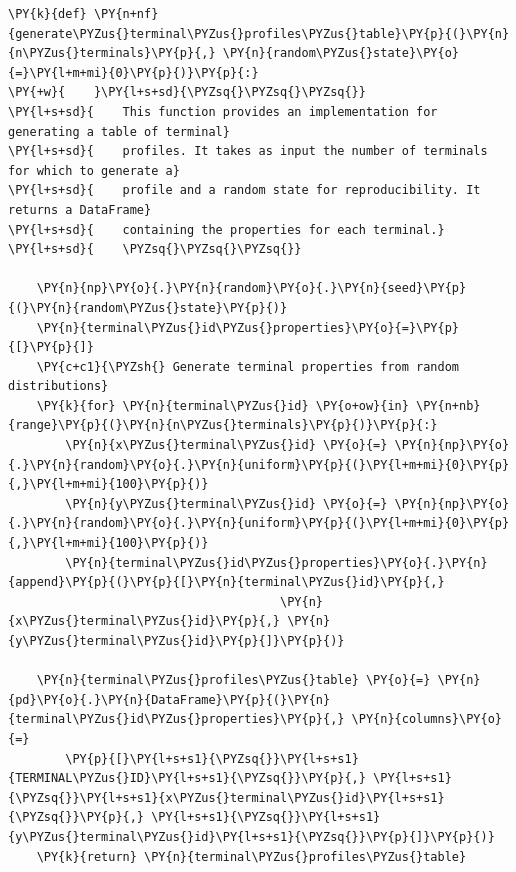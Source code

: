    \begin{tcolorbox}[breakable, size=fbox, boxrule=1pt, pad at break*=1mm,colback=cellbackground, colframe=cellborder]
\begin{Verbatim}[commandchars=\\\{\}]
\PY{k}{def} \PY{n+nf}{generate\PYZus{}terminal\PYZus{}profiles\PYZus{}table}\PY{p}{(}\PY{n}{n\PYZus{}terminals}\PY{p}{,} \PY{n}{random\PYZus{}state}\PY{o}{=}\PY{l+m+mi}{0}\PY{p}{)}\PY{p}{:}
\PY{+w}{    }\PY{l+s+sd}{\PYZsq{}\PYZsq{}\PYZsq{}}
\PY{l+s+sd}{    This function provides an implementation for generating a table of terminal}
\PY{l+s+sd}{    profiles. It takes as input the number of terminals for which to generate a}
\PY{l+s+sd}{    profile and a random state for reproducibility. It returns a DataFrame}
\PY{l+s+sd}{    containing the properties for each terminal.}
\PY{l+s+sd}{    \PYZsq{}\PYZsq{}\PYZsq{}}

    \PY{n}{np}\PY{o}{.}\PY{n}{random}\PY{o}{.}\PY{n}{seed}\PY{p}{(}\PY{n}{random\PYZus{}state}\PY{p}{)}
    \PY{n}{terminal\PYZus{}id\PYZus{}properties}\PY{o}{=}\PY{p}{[}\PY{p}{]}
    \PY{c+c1}{\PYZsh{} Generate terminal properties from random distributions}
    \PY{k}{for} \PY{n}{terminal\PYZus{}id} \PY{o+ow}{in} \PY{n+nb}{range}\PY{p}{(}\PY{n}{n\PYZus{}terminals}\PY{p}{)}\PY{p}{:}
        \PY{n}{x\PYZus{}terminal\PYZus{}id} \PY{o}{=} \PY{n}{np}\PY{o}{.}\PY{n}{random}\PY{o}{.}\PY{n}{uniform}\PY{p}{(}\PY{l+m+mi}{0}\PY{p}{,}\PY{l+m+mi}{100}\PY{p}{)}
        \PY{n}{y\PYZus{}terminal\PYZus{}id} \PY{o}{=} \PY{n}{np}\PY{o}{.}\PY{n}{random}\PY{o}{.}\PY{n}{uniform}\PY{p}{(}\PY{l+m+mi}{0}\PY{p}{,}\PY{l+m+mi}{100}\PY{p}{)}
        \PY{n}{terminal\PYZus{}id\PYZus{}properties}\PY{o}{.}\PY{n}{append}\PY{p}{(}\PY{p}{[}\PY{n}{terminal\PYZus{}id}\PY{p}{,}
                                      \PY{n}{x\PYZus{}terminal\PYZus{}id}\PY{p}{,} \PY{n}{y\PYZus{}terminal\PYZus{}id}\PY{p}{]}\PY{p}{)}

    \PY{n}{terminal\PYZus{}profiles\PYZus{}table} \PY{o}{=} \PY{n}{pd}\PY{o}{.}\PY{n}{DataFrame}\PY{p}{(}\PY{n}{terminal\PYZus{}id\PYZus{}properties}\PY{p}{,} \PY{n}{columns}\PY{o}{=}
        \PY{p}{[}\PY{l+s+s1}{\PYZsq{}}\PY{l+s+s1}{TERMINAL\PYZus{}ID}\PY{l+s+s1}{\PYZsq{}}\PY{p}{,} \PY{l+s+s1}{\PYZsq{}}\PY{l+s+s1}{x\PYZus{}terminal\PYZus{}id}\PY{l+s+s1}{\PYZsq{}}\PY{p}{,} \PY{l+s+s1}{\PYZsq{}}\PY{l+s+s1}{y\PYZus{}terminal\PYZus{}id}\PY{l+s+s1}{\PYZsq{}}\PY{p}{]}\PY{p}{)}
    \PY{k}{return} \PY{n}{terminal\PYZus{}profiles\PYZus{}table}
\end{Verbatim}
\end{tcolorbox}

